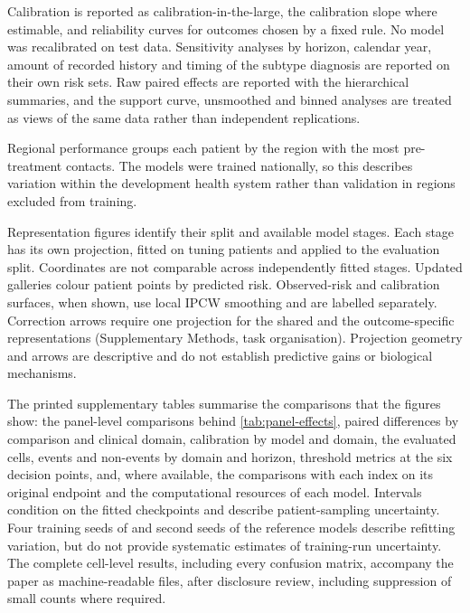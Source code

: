 Calibration is reported as calibration-in-the-large, the calibration slope
where estimable, and reliability curves for outcomes chosen by a fixed rule. No
model was recalibrated on test data. Sensitivity analyses by horizon, calendar
year, amount of recorded history and timing of the subtype diagnosis are
reported on their own risk sets. Raw paired effects are reported with the
hierarchical summaries, and the support curve, unsmoothed and binned analyses
are treated as views of the same data rather than independent replications.

Regional performance groups each patient by the region with the most
pre-treatment contacts. The models were trained nationally, so this describes
variation within the development health system rather than validation in
regions excluded from training.

Representation figures identify their split and available model stages.
Each stage has its own projection, fitted on tuning patients and applied to
the evaluation split. Coordinates are not comparable across independently
fitted stages. Updated galleries colour patient points by predicted risk.
Observed-risk and calibration surfaces, when shown, use local IPCW smoothing
and are labelled separately. Correction arrows require one projection for the
shared and the outcome-specific representations
(Supplementary Methods, task organisation). Projection geometry and arrows are
descriptive and do not establish predictive gains or biological mechanisms.

The printed supplementary tables summarise the comparisons that the figures
show: the panel-level comparisons behind \cref{tab:panel-effects}, paired differences by
comparison and clinical domain, calibration by model and domain, the evaluated
cells, events and non-events by domain and horizon, threshold metrics at the
six decision points, and, where available, the comparisons with each index on
its original endpoint and the computational resources of each model. Intervals condition on the fitted checkpoints and describe patient-sampling
uncertainty. Four training seeds of \opera{} and second seeds of the reference models
describe refitting variation, but do not provide systematic estimates of
training-run uncertainty. The
complete cell-level results, including every confusion matrix, accompany the
paper as machine-readable files, after disclosure review, including suppression of small counts where required.


